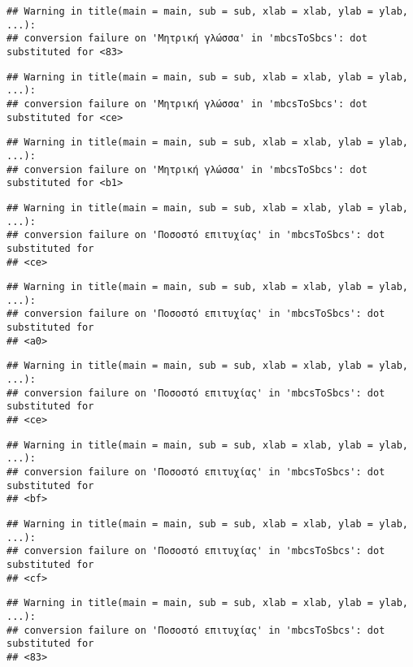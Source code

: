 \documentclass[
]{article}
\begin{document}
\begin{verbatim}
## Warning in title(main = main, sub = sub, xlab = xlab, ylab = ylab, ...):
## conversion failure on 'Μητρική γλώσσα' in 'mbcsToSbcs': dot substituted for <83>
\end{verbatim}

\begin{verbatim}
## Warning in title(main = main, sub = sub, xlab = xlab, ylab = ylab, ...):
## conversion failure on 'Μητρική γλώσσα' in 'mbcsToSbcs': dot substituted for <ce>
\end{verbatim}

\begin{verbatim}
## Warning in title(main = main, sub = sub, xlab = xlab, ylab = ylab, ...):
## conversion failure on 'Μητρική γλώσσα' in 'mbcsToSbcs': dot substituted for <b1>
\end{verbatim}

\begin{verbatim}
## Warning in title(main = main, sub = sub, xlab = xlab, ylab = ylab, ...):
## conversion failure on 'Ποσοστό επιτυχίας' in 'mbcsToSbcs': dot substituted for
## <ce>
\end{verbatim}

\begin{verbatim}
## Warning in title(main = main, sub = sub, xlab = xlab, ylab = ylab, ...):
## conversion failure on 'Ποσοστό επιτυχίας' in 'mbcsToSbcs': dot substituted for
## <a0>
\end{verbatim}

\begin{verbatim}
## Warning in title(main = main, sub = sub, xlab = xlab, ylab = ylab, ...):
## conversion failure on 'Ποσοστό επιτυχίας' in 'mbcsToSbcs': dot substituted for
## <ce>
\end{verbatim}

\begin{verbatim}
## Warning in title(main = main, sub = sub, xlab = xlab, ylab = ylab, ...):
## conversion failure on 'Ποσοστό επιτυχίας' in 'mbcsToSbcs': dot substituted for
## <bf>
\end{verbatim}

\begin{verbatim}
## Warning in title(main = main, sub = sub, xlab = xlab, ylab = ylab, ...):
## conversion failure on 'Ποσοστό επιτυχίας' in 'mbcsToSbcs': dot substituted for
## <cf>
\end{verbatim}

\begin{verbatim}
## Warning in title(main = main, sub = sub, xlab = xlab, ylab = ylab, ...):
## conversion failure on 'Ποσοστό επιτυχίας' in 'mbcsToSbcs': dot substituted for
## <83>
\end{verbatim}
\end{document}
